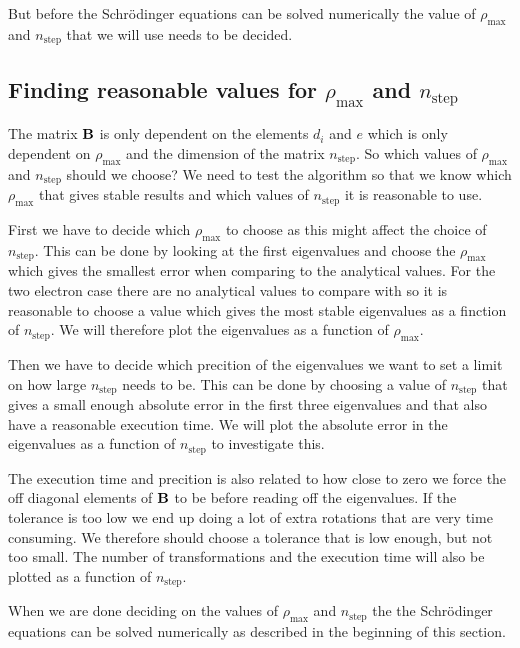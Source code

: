 \documentclass[11pt,a4wide]{article}
\begin{document}
But before the Schr\"odinger equations can be solved numerically the value of $\rho_{\mathrm{max}}$ and $n_{\mathrm{step}}$ that we will use needs to be decided.  

\subsection{Finding reasonable values for $\rho_{\mathrm{max}}$ and $n_{\mathrm{step}}$}

The matrix $\bf B$ is only dependent on the elements $d_i$ and $e$ which is only dependent on $\rho_{\mathrm{max}}$ and the dimension of the matrix $n_{\mathrm{step}}$. So which values of $\rho_{\mathrm{max}}$ and $n_{\mathrm{step}}$ should we choose? We need to test the algorithm so that we know which $\rho_{\mathrm{max}}$ that gives stable results and which values of $n_{\mathrm{step}}$ it is reasonable to use. 

First we have to decide which $\rho_{\mathrm{max}}$ to choose as this might affect the choice of $n_{\mathrm{step}}$. This can be done by looking at the first eigenvalues and choose the $\rho_{\mathrm{max}}$ which gives the smallest error when comparing to the analytical values. For the two electron case there are no analytical values to compare with so it is reasonable to choose a value which gives the most stable eigenvalues as a finction of  $n_{\mathrm{step}}$. We will therefore plot the eigenvalues as a function of $\rho_{\mathrm{max}}$.

Then we have to decide which precition of the eigenvalues we want to set a limit on how large $n_{\mathrm{step}}$ needs to be. This can be done by choosing a value of $n_{\mathrm{step}}$ that gives a small enough absolute error in the first three eigenvalues and that also have a reasonable execution time. We will plot the absolute error in the eigenvalues as a function of $n_{\mathrm{step}}$ to investigate this.

The execution time and precition is also related to how close to zero we force the off diagonal elements of $\bf B$ to be before reading off the eigenvalues. If the tolerance is too low we end up doing a lot of extra rotations that are very time consuming. We therefore should choose a tolerance that is low enough, but not too small. The number of transformations and the execution time will also be plotted as a function of $n_{\mathrm{step}}$.

When we are done deciding on the values of $\rho_{\mathrm{max}}$ and $n_{\mathrm{step}}$ the the Schr\"odinger equations can be solved numerically as described in the beginning of this section. 
\end{document}

